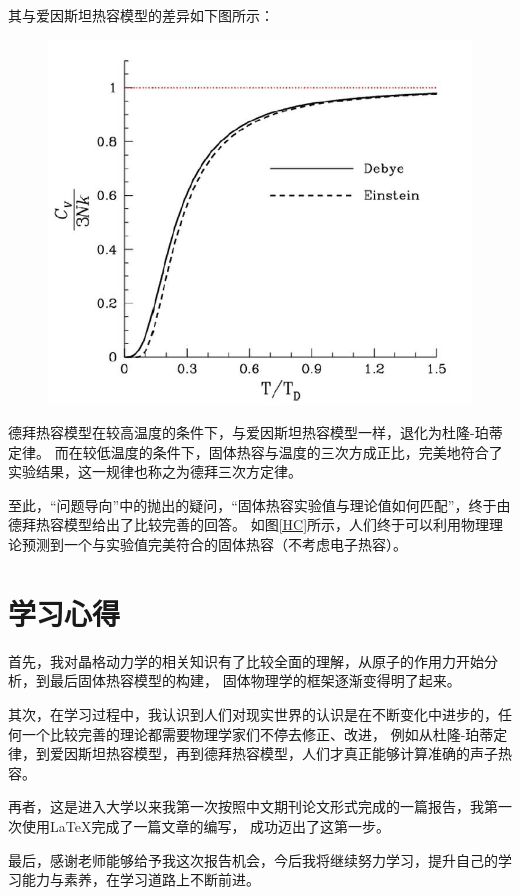 \documentclass[declarePage]{ecnuthesis}
\begin{document}
其与爱因斯坦热容模型的差异如下图所示：
\begin{figure}[htb]
    \centering
    \includegraphics[width=.46\textwidth]{DE.png}
\end{figure}

德拜热容模型在较高温度的条件下，与爱因斯坦热容模型一样，退化为杜隆-珀蒂定律。%
而在较低温度的条件下，固体热容与温度的三次方成正比，完美地符合了实验结果，这一规律也称之为德拜三次方定律。

至此，“问题导向”中的抛出的疑问，“固体热容实验值与理论值如何匹配”，终于由德拜热容模型给出了比较完善的回答。
如图\ref{HC}所示，人们终于可以利用物理理论预测到一个与实验值完美符合的固体热容（不考虑电子热容）。

\chapter{学习心得}

首先，我对晶格动力学的相关知识有了比较全面的理解，从原子的作用力开始分析，到最后固体热容模型的构建，%
固体物理学的框架逐渐变得明了起来。

其次，在学习过程中，我认识到人们对现实世界的认识是在不断变化中进步的，任何一个比较完善的理论都需要物理学家们不停去修正、改进，%
例如从杜隆-珀蒂定律，到爱因斯坦热容模型，再到德拜热容模型，人们才真正能够计算准确的声子热容。

再者，这是进入大学以来我第一次按照中文期刊论文形式完成的一篇报告，我第一次使用\LaTeX 完成了一篇文章的编写，%
成功迈出了这第一步。

最后，感谢老师能够给予我这次报告机会，今后我将继续努力学习，提升自己的学习能力与素养，在学习道路上不断前进。

\backmatter
\PrintReference
\end{document}
